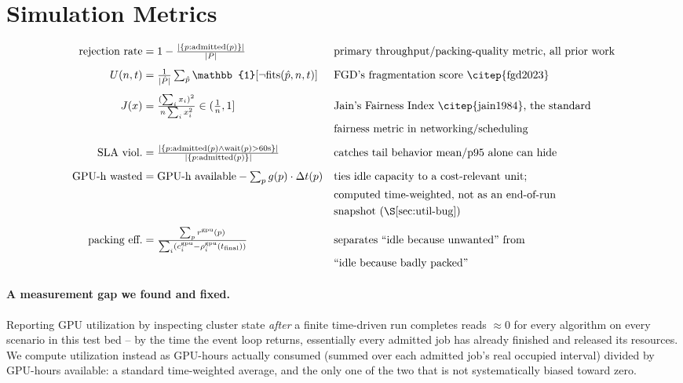 \documentclass[11pt]{article}
\begin{document}
\section{Simulation Metrics}
\label{sec:metrics}
\begin{small}
\begin{align*}
  \text{rejection rate} &= 1 - \tfrac{|\{p:\text{admitted}(p)\}|}{|P|}
  &&\text{primary throughput/packing-quality metric, all prior work} \\[4pt]
  U(n,t) &= \tfrac{1}{|\hat P|}\textstyle\sum_{\hat p} \mathbb{1}[\neg\mathrm{fits}(\hat p,n,t)]
  &&\text{FGD's fragmentation score \citep{fgd2023}} \\[4pt]
  J(x) &= \tfrac{(\sum_i x_i)^2}{n\sum_i x_i^2} \in (\tfrac1n,1]
  &&\text{Jain's Fairness Index \citep{jain1984}, the standard} \\
  & && \text{fairness metric in networking/scheduling} \\[4pt]
  \text{SLA viol.} &= \tfrac{|\{p:\text{admitted}(p)\wedge\text{wait}(p)>60\text{s}\}|}{|\{p:\text{admitted}(p)\}|}
  &&\text{catches tail behavior mean/p95 alone can hide} \\[4pt]
  \text{GPU-h wasted} &= \text{GPU-h available} - \textstyle\sum_{p} g(p)\cdot\Delta t(p)
  &&\text{ties idle capacity to a cost-relevant unit;}\\
  & && \text{computed time-weighted, not as an end-of-run} \\
  & && \text{snapshot (\S\ref{sec:util-bug})} \\[4pt]
  \text{packing eff.} &= \tfrac{\sum_p r^{\text{gpu}}(p)}{\sum_i(c^{\text{gpu}}_i - \rho^{\text{gpu}}_i(t_{\text{final}}))}
  &&\text{separates ``idle because unwanted'' from} \\
  & && \text{``idle because badly packed''}
\end{align*}
\end{small}

\paragraph{A measurement gap we found and fixed.}
\label{sec:util-bug}
Reporting GPU utilization by inspecting cluster state \emph{after} a
finite time-driven run completes reads $\approx0$ for every algorithm on
every scenario in this test bed -- by the time the event loop returns,
essentially every admitted job has already finished and released its
resources. We compute utilization instead as GPU-hours actually consumed
(summed over each admitted job's real occupied interval) divided by
GPU-hours available: a standard time-weighted average, and the only one
of the two that is not systematically biased toward zero.
\end{document}
